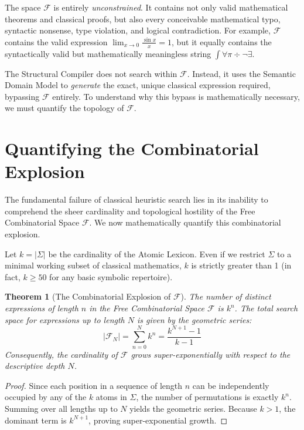 \documentclass[12pt,openany]{extbook}
\theoremstyle{plain}
\newtheorem{theorem}{Theorem}[chapter]
\theoremstyle{definition}
\begin{document}
The space $\mathcal{F}$ is entirely \emph{unconstrained}. It contains not only valid mathematical theorems and classical proofs, but also every conceivable mathematical typo, syntactic nonsense, type violation, and logical contradiction. For example, $\mathcal{F}$ contains the valid expression $\lim_{x \to 0} \frac{\sin x}{x} = 1$, but it equally contains the syntactically valid but mathematically meaningless string $\int \forall \pi \div \neg \exists$.

The Structural Compiler does not search within $\mathcal{F}$. Instead, it uses the Semantic Domain Model to \emph{generate} the exact, unique classical expression required, bypassing $\mathcal{F}$ entirely. To understand why this bypass is mathematically necessary, we must quantify the topology of $\mathcal{F}$.

\section{Quantifying the Combinatorial Explosion}

The fundamental failure of classical heuristic search lies in its inability to comprehend the sheer cardinality and topological hostility of the Free Combinatorial Space $\mathcal{F}$. We now mathematically quantify this combinatorial explosion.

Let $k = |\Sigma|$ be the cardinality of the Atomic Lexicon. Even if we restrict $\Sigma$ to a minimal working subset of classical mathematics, $k$ is strictly greater than 1 (in fact, $k \geq 50$ for any basic symbolic repertoire).

\begin{theorem}[The Combinatorial Explosion of $\mathcal{F}$]
The number of distinct expressions of length $n$ in the Free Combinatorial Space $\mathcal{F}$ is $k^n$. The total search space for expressions up to length $N$ is given by the geometric series:
\[
|\mathcal{F}_N| = \sum_{n=0}^{N} k^n = \frac{k^{N+1} - 1}{k - 1}
\]
Consequently, the cardinality of $\mathcal{F}$ grows super-exponentially with respect to the descriptive depth $N$.
\end{theorem}

\begin{proof}
Since each position in a sequence of length $n$ can be independently occupied by any of the $k$ atoms in $\Sigma$, the number of permutations is exactly $k^n$. Summing over all lengths up to $N$ yields the geometric series. Because $k > 1$, the dominant term is $k^{N+1}$, proving super-exponential growth.
\end{proof}
\end{document}
